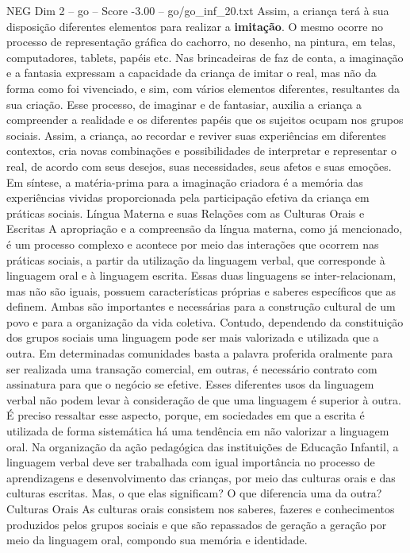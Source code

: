 \begin{textsample}{NEG Dim 2 – go – Score -3.00 – go/go\_inf\_20.txt}
Assim, a criança terá à sua disposição diferentes elementos para realizar a \textbf{imitação}.
O mesmo ocorre no processo de representação gráfica do cachorro, no desenho, na pintura, em telas, computadores, tablets, papéis etc.
Nas brincadeiras de faz de conta, a imaginação e a fantasia expressam a capacidade da criança de imitar o real, mas não da forma como foi vivenciado, e sim, com vários elementos diferentes, resultantes da sua criação.
Esse processo, de imaginar e de fantasiar, auxilia a criança a compreender a realidade e os diferentes papéis que os sujeitos ocupam nos grupos sociais.
Assim, a criança, ao recordar e reviver suas experiências em diferentes contextos, cria novas combinações e possibilidades de interpretar e representar o real, de acordo com seus desejos, suas necessidades, seus afetos e suas emoções.
Em síntese, a matéria-prima para a imaginação criadora é a memória das experiências vividas proporcionada pela participação efetiva da criança em práticas sociais.
Língua Materna e suas Relações com as Culturas Orais e Escritas A apropriação e a compreensão da língua materna, como já mencionado, é um processo complexo e acontece por meio das interações que ocorrem nas práticas sociais, a partir da utilização da linguagem verbal, que corresponde à linguagem oral e à linguagem escrita.
Essas duas linguagens se inter-relacionam, mas não são iguais, possuem características próprias e saberes específicos que as definem.
Ambas são importantes e necessárias para a construção cultural de um povo e para a organização da vida coletiva.
Contudo, dependendo da constituição dos grupos sociais uma linguagem pode ser mais valorizada e utilizada que a outra.
Em determinadas comunidades basta a palavra proferida oralmente para ser realizada uma transação comercial, em outras, é necessário contrato com assinatura para que o negócio se efetive.
Esses diferentes usos da linguagem verbal não podem levar à consideração de que uma linguagem é superior à outra.
É preciso ressaltar esse aspecto, porque, em sociedades em que a escrita é utilizada de forma sistemática há uma tendência em não valorizar a linguagem oral.
Na organização da ação pedagógica das instituições de Educação Infantil, a linguagem verbal deve ser trabalhada com igual importância no processo de aprendizagens e desenvolvimento das crianças, por meio das culturas orais e das culturas escritas.
Mas, o que elas significam?
O que diferencia uma da outra?
Culturas Orais As culturas orais consistem nos saberes, fazeres e conhecimentos produzidos pelos grupos sociais e que são repassados de geração a geração por meio da linguagem oral, compondo sua memória e identidade.

\end{textsample}
